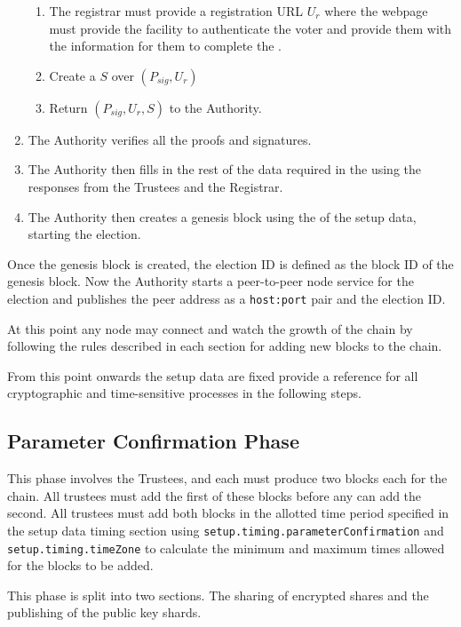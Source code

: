 \begin{enumerate}
\begin{enumerate}
              \item The registrar must provide a registration URL $U_r$ where the webpage must provide the facility to authenticate the voter and provide them with the information for them to complete the .
              \item Create a  $S$ over $(P_{sig}, U_r)$
              \item Return $(P_{sig}, U_r, S)$ to the Authority.
          \end{enumerate}
    \item The Authority verifies all the proofs and signatures.
    \item The Authority then fills in the rest of the data required in the  using the responses from the Trustees and the Registrar.
    \item The Authority then creates a genesis block using the  of the setup data, starting the election.
\end{enumerate}

Once the genesis block is created, the election ID is defined as the block ID of the genesis block. Now the Authority starts a peer-to-peer node service for the election and publishes the peer address as a \texttt{host:port} pair and the election ID.

At this point any node may connect and watch the growth of the chain by following the rules described in each section for adding new blocks to the chain.

From this point onwards the setup data are fixed provide a reference for all cryptographic and time-sensitive processes in the following steps.

\subsection{Parameter Confirmation Phase}
\label{ch:astris:detail:params}

This phase involves the Trustees, and each must produce two blocks each for the chain. All trustees must add the first of these blocks before any can add the second. All trustees must add both blocks in the allotted time period specified in the setup data timing section using \texttt{setup.timing.parameterConfirmation} and \texttt{setup.timing.timeZone} to calculate the minimum and maximum times allowed for the blocks to be added.

This phase is split into two sections. The sharing of encrypted shares and the publishing of the public key shards.

